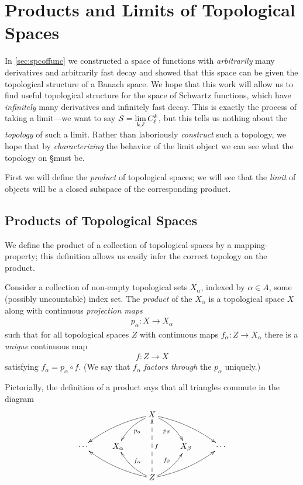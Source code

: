 
  \chapter{Products and Limits of Topological Spaces}
    In \autoref{sec:spcoffunc} we constructed a space of functions with \emph{arbitrarily} many derivatives and arbitrarily fast decay and showed that this space can be given the topological structure of a Banach space.
    We hope that this work will allow us to find useful topological structure for the space of Schwartz functions, which have \emph{infinitely} many derivatives and infinitely fast decay.
    This is exactly the process of taking a limit---we want to say $\S=\lim\limits_{k,\ell}C^k_\ell$, but this tells us nothing about the \emph{topology} of such a limit.
    Rather than laboriously \emph{construct} such a topology, we hope that by \emph{characterizing} the behavior of the limit object we can see what the topology on \S must be.

    First we will define the \emph{product} of topological spaces; we will see that the \emph{limit} of objects will be a closed subspace of the corresponding product.

    \section{Products of Topological Spaces}
      We define the product of a collection of topological spaces by a mapping-property; this definition allows us easily infer the correct topology on the product.
      \begin{defn}
        Consider a collection of non-empty topological sets $X_\alpha$, indexed by $\alpha\in A$, some (possibly uncountable) index set.
        The \emph{product} of the $X_\alpha$ is a topological space $X$ along with continuous \emph{projection maps} 
        \begin{align*}
          p_\alpha:X\longrightarrow X_\alpha
        \end{align*}
        such that for all topological spaces $Z$ with continuous maps $f_\alpha:Z\rightarrow X_\alpha$ there is a \emph{unique} continuous map 
        \begin{align*}
          f:Z\longrightarrow X
        \end{align*}
        satisfying $f_\alpha=p_\alpha\circ f$.
        (We say that $f_\alpha$ \emph{factors through} the $p_\alpha$ uniquely.)
      \end{defn}
      Pictorially, the definition of a product says that all triangles commute in the diagram
      \begin{displaymath}
        \xymatrix{
          && X \ar@/_/[dll] \ar@/_/[dl]^{p_\alpha} \ar@/^/[dr]_{p_\beta} \ar@/^/[drr] \\
          \cdots & X_\alpha && X_\beta & \cdots\\
          && Z \ar@/^/[ull] \ar@/^/[ul]_{f_\alpha} \ar@{-->}[uu]_f \ar@/_/[ur]^{f_\beta} \ar@/_/[urr]
         }
      \end{displaymath}

